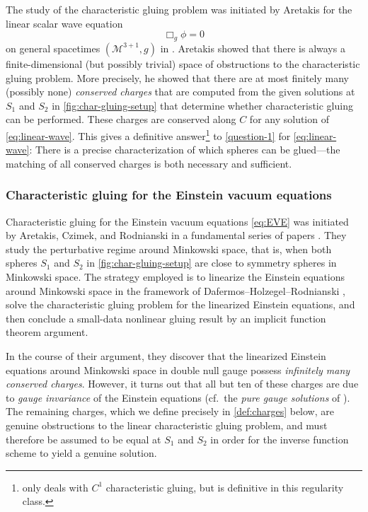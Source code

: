 \documentclass[10pt]{article}
\numberwithin{equation}{section}
\theoremstyle{plain}
\theoremstyle{definition}
\begin{document}
The study of the characteristic gluing problem was initiated by Aretakis for the linear scalar wave equation
\begin{equation}
    \Box_g\phi=0 \label{eq:linear-wave}
\end{equation}
on general spacetimes $(\mathcal M^{3+1},g)$ in \cite{AretakisLinear}. Aretakis showed that there is always a finite-dimensional (but possibly trivial) space of obstructions to the characteristic gluing problem. More precisely, he showed that there are at most finitely many (possibly none) \emph{conserved charges} that are computed from the given solutions at $S_1$ and $S_2$ in \cref{fig:char-gluing-setup} that determine whether characteristic gluing can be performed. These charges are conserved along $C$ for any solution of \eqref{eq:linear-wave}. This gives a definitive answer\footnote{\cite{AretakisLinear} only deals with $C^1$ characteristic gluing, but is definitive in this regularity class.} to \cref{question-1} for \eqref{eq:linear-wave}: There is a precise characterization of which spheres can be glued---the matching of all conserved charges is both necessary and sufficient. 

\subsubsection{Characteristic gluing for the Einstein vacuum equations}\label{sec:ACR}

Characteristic gluing for the Einstein vacuum equations \eqref{eq:EVE} was initiated by Aretakis, Czimek, and Rodnianski in a fundamental series of papers \cite{ACR1, ACR2, ACR3}. They study the perturbative regime around Minkowski space, that is, when both spheres $S_1$ and $S_2$ in \cref{fig:char-gluing-setup} are close to symmetry spheres in Minkowski space. The strategy employed is to linearize the Einstein equations around Minkowski space in the framework of Dafermos--Holzegel--Rodnianski \cite{DHR19}, solve the characteristic gluing problem for the linearized Einstein equations, and then conclude a small-data nonlinear gluing result by an implicit function theorem argument. 

In the course of their argument, they discover that the linearized Einstein equations around Minkowski space in double null gauge possess \emph{infinitely many conserved charges}. However, it turns out that all but ten of these charges are due to \emph{gauge invariance} of the Einstein equations (cf.~the \emph{pure gauge solutions} of \cite{DHR19}). The remaining charges, which we define precisely in \cref{def:charges} below, are genuine obstructions to the linear characteristic gluing problem, and must therefore be assumed to be equal at $S_1$ and $S_2$ in order for the inverse function scheme to yield a genuine solution. 
\end{document}

